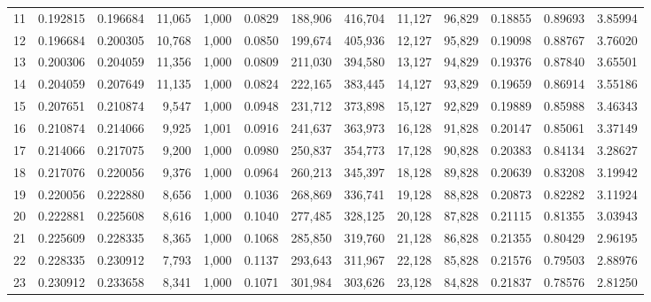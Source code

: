 \begin{tabular}{rrrrrrrrrrrrr}
11  &  0.192815 &  0.196684 &  11,065 &  1,000 &                                     0.0829 &  188,906 &  416,704 &   11,127 &   96,829 &  0.18855 &  0.89693 &  3.85994 \\
12  &  0.196684 &  0.200305 &  10,768 &  1,000 &                                     0.0850 &  199,674 &  405,936 &   12,127 &   95,829 &  0.19098 &  0.88767 &  3.76020 \\
13  &  0.200306 &  0.204059 &  11,356 &  1,000 &                                     0.0809 &  211,030 &  394,580 &   13,127 &   94,829 &  0.19376 &  0.87840 &  3.65501 \\
14  &  0.204059 &  0.207649 &  11,135 &  1,000 &                                     0.0824 &  222,165 &  383,445 &   14,127 &   93,829 &  0.19659 &  0.86914 &  3.55186 \\
15  &  0.207651 &  0.210874 &   9,547 &  1,000 &                                     0.0948 &  231,712 &  373,898 &   15,127 &   92,829 &  0.19889 &  0.85988 &  3.46343 \\
16  &  0.210874 &  0.214066 &   9,925 &  1,001 &                                     0.0916 &  241,637 &  363,973 &   16,128 &   91,828 &  0.20147 &  0.85061 &  3.37149 \\
17  &  0.214066 &  0.217075 &   9,200 &  1,000 &                                     0.0980 &  250,837 &  354,773 &   17,128 &   90,828 &  0.20383 &  0.84134 &  3.28627 \\
18  &  0.217076 &  0.220056 &   9,376 &  1,000 &                                     0.0964 &  260,213 &  345,397 &   18,128 &   89,828 &  0.20639 &  0.83208 &  3.19942 \\
19  &  0.220056 &  0.222880 &   8,656 &  1,000 &                                     0.1036 &  268,869 &  336,741 &   19,128 &   88,828 &  0.20873 &  0.82282 &  3.11924 \\
20  &  0.222881 &  0.225608 &   8,616 &  1,000 &                                     0.1040 &  277,485 &  328,125 &   20,128 &   87,828 &  0.21115 &  0.81355 &  3.03943 \\
21  &  0.225609 &  0.228335 &   8,365 &  1,000 &                                     0.1068 &  285,850 &  319,760 &   21,128 &   86,828 &  0.21355 &  0.80429 &  2.96195 \\
22  &  0.228335 &  0.230912 &   7,793 &  1,000 &                                     0.1137 &  293,643 &  311,967 &   22,128 &   85,828 &  0.21576 &  0.79503 &  2.88976 \\
23  &  0.230912 &  0.233658 &   8,341 &  1,000 &                                     0.1071 &  301,984 &  303,626 &   23,128 &   84,828 &  0.21837 &  0.78576 &  2.81250 \\

\end{tabular}
